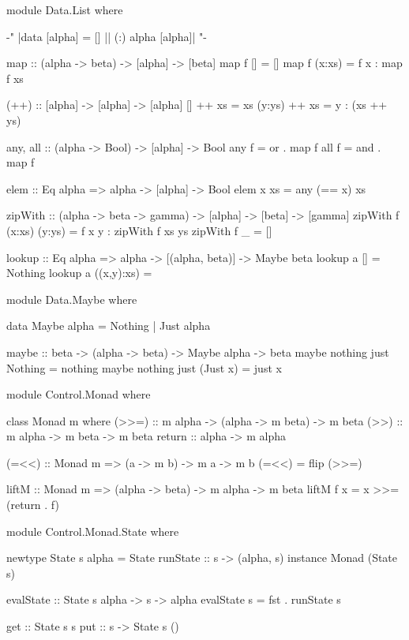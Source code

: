 \begin{code}
module Data.List where

{-" |data [alpha] = [] || (:) alpha [alpha]| "-}

map :: (alpha -> beta) -> [alpha] -> [beta]
map f []      = []
map f (x:xs)  = f x : map f xs

(++) :: [alpha] -> [alpha] -> [alpha]
[] ++ xs = xs
(y:ys) ++ xs = y : (xs ++ ys)

any, all :: (alpha -> Bool) -> [alpha] -> Bool
any  f = or   . map f
all  f = and  . map f

elem :: Eq alpha => alpha -> [alpha] -> Bool
elem x xs = any (== x) xs

zipWith :: (alpha -> beta -> gamma) -> [alpha] -> [beta] -> [gamma]
zipWith f (x:xs) (y:ys) = f x y : zipWith f xs ys
zipWith f _ = []

lookup :: Eq alpha => alpha -> [(alpha, beta)] -> Maybe beta
lookup a [] = Nothing
lookup a ((x,y):xs) = 
\end{code}

\begin{code}
module Data.Maybe where

data Maybe alpha = Nothing | Just alpha

maybe :: beta -> (alpha -> beta) -> Maybe alpha -> beta
maybe nothing just Nothing   = nothing
maybe nothing just (Just x)  = just x
\end{code}

\begin{code}
module Control.Monad where

class Monad m where
		(>>=) :: m alpha -> (alpha -> m beta) -> m beta
		(>>) :: m alpha -> m beta -> m beta
		return :: alpha -> m alpha

(=<<) :: Monad m => (a -> m b) -> m a -> m b
(=<<) = flip (>>=)

liftM :: Monad m => (alpha -> beta) -> m alpha -> m beta
liftM f x = x >>= (return . f)
\end{code}

\begin{code}
module Control.Monad.State where

newtype State s alpha = State {runState :: s -> (alpha, s)}
instance Monad (State s)

evalState :: State s alpha -> s -> alpha
evalState s = fst . runState s

get :: State s s
put :: s -> State s ()
\end{code}
